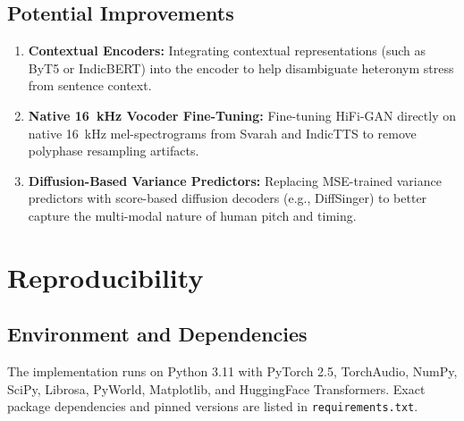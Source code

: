 \documentclass[11pt,a4paper]{report}
\begin{document}
\section{Potential Improvements}
\begin{enumerate}
    \item \textbf{Contextual Encoders:} Integrating contextual representations (such as ByT5 or IndicBERT) into the encoder to help disambiguate heteronym stress from sentence context.
    \item \textbf{Native 16~kHz Vocoder Fine-Tuning:} Fine-tuning HiFi-GAN directly on native 16~kHz mel-spectrograms from Svarah and IndicTTS to remove polyphase resampling artifacts.
    \item \textbf{Diffusion-Based Variance Predictors:} Replacing MSE-trained variance predictors with score-based diffusion decoders (e.g., DiffSinger) to better capture the multi-modal nature of human pitch and timing.
\end{enumerate}

\FloatBarrier
\vspace{1.5em}

\chapter{Reproducibility}

\section{Environment and Dependencies}
The implementation runs on Python 3.11 with PyTorch 2.5, TorchAudio, NumPy, SciPy, Librosa, PyWorld, Matplotlib, and HuggingFace Transformers. Exact package dependencies and pinned versions are listed in \texttt{requirements.txt}.
\end{document}
